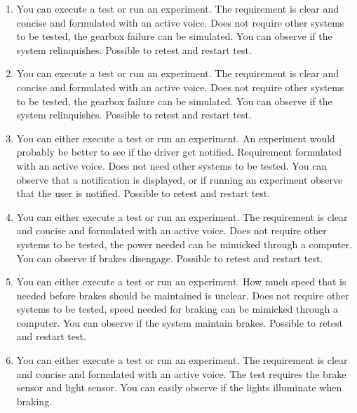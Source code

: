 \begin{enumerate}
    \item{You can execute a test or run an experiment. The requirement is clear and concise and formulated with an active voice. Does not require other systems to be tested, the gearbox failure can be simulated. You can observe if the system relinquishes. Possible to retest and restart test.}
    \item{You can execute a test or run an experiment. The requirement is clear and concise and formulated with an active voice. Does not require other systems to be tested, the gearbox failure can be simulated. You can observe if the system relinquishes. Possible to retest and restart test.}

    \item{You can either execute a test or run an experiment. An experiment would probably be better to see if the driver get notified. Requirement formulated with an active voice. Does not need other systems to be tested. You can observe that a notification is displayed, or if running an experiment observe that the user is notified. Possible to retest and restart test.}

    \item{You can either execute a test or run an experiment. The requirement is clear and concise and formulated with an active voice. Does not require other systems to be tested, the power needed can be mimicked through a computer. You can observe if brakes disengage. Possible to retest and restart test.}
    \item{You can either execute a test or run an experiment. How much speed that is needed before brakes should be maintained is unclear. Does not require other systems to be tested, speed needed for braking can be mimicked through a computer. You can observe if the system maintain brakes. Possible to retest and restart test.}
    \item{You can either execute a test or run an experiment. The requirement is clear and concise and formulated with an active voice. The test requires the brake sensor and light sensor. You can easily observe if the lights illuminate when braking.}
\end{enumerate}
